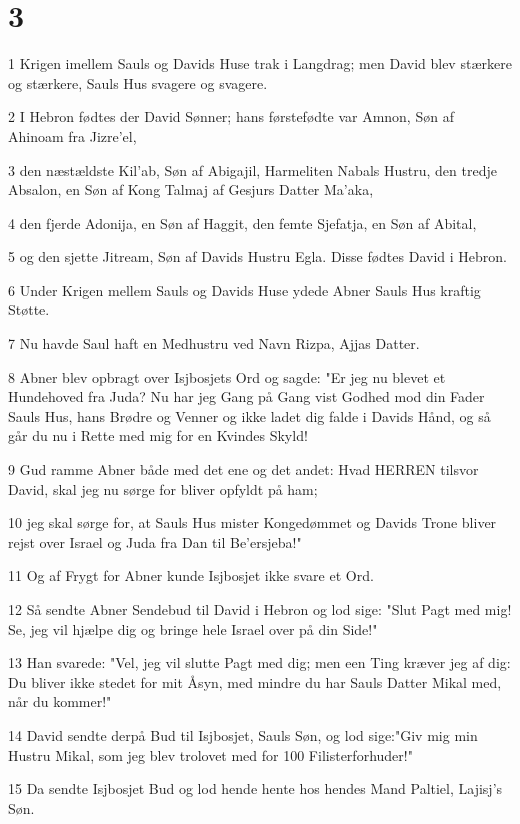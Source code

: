 \chapter{3}

\par 1 Krigen imellem Sauls og Davids Huse trak i Langdrag; men David blev stærkere og stærkere, Sauls Hus svagere og svagere.
\par 2 I Hebron fødtes der David Sønner; hans førstefødte var Amnon, Søn af Ahinoam fra Jizre'el,
\par 3 den næstældste Kil'ab, Søn af Abigajil, Harmeliten Nabals Hustru, den tredje Absalon, en Søn af Kong Talmaj af Gesjurs Datter Ma'aka,
\par 4 den fjerde Adonija, en Søn af Haggit, den femte Sjefatja, en Søn af Abital,
\par 5 og den sjette Jitream, Søn af Davids Hustru Egla. Disse fødtes David i Hebron.
\par 6 Under Krigen mellem Sauls og Davids Huse ydede Abner Sauls Hus kraftig Støtte.
\par 7 Nu havde Saul haft en Medhustru ved Navn Rizpa, Ajjas Datter.
\par 8 Abner blev opbragt over Isjbosjets Ord og sagde: "Er jeg nu blevet et Hundehoved fra Juda? Nu har jeg Gang på Gang vist Godhed mod din Fader Sauls Hus, hans Brødre og Venner og ikke ladet dig falde i Davids Hånd, og så går du nu i Rette med mig for en Kvindes Skyld!
\par 9 Gud ramme Abner både med det ene og det andet: Hvad HERREN tilsvor David, skal jeg nu sørge for bliver opfyldt på ham;
\par 10 jeg skal sørge for, at Sauls Hus mister Kongedømmet og Davids Trone bliver rejst over Israel og Juda fra Dan til Be'ersjeba!"
\par 11 Og af Frygt for Abner kunde Isjbosjet ikke svare et Ord.
\par 12 Så sendte Abner Sendebud til David i Hebron og lod sige: "Slut Pagt med mig! Se, jeg vil hjælpe dig og bringe hele Israel over på din Side!"
\par 13 Han svarede: "Vel, jeg vil slutte Pagt med dig; men een Ting kræver jeg af dig: Du bliver ikke stedet for mit Åsyn, med mindre du har Sauls Datter Mikal med, når du kommer!"
\par 14 David sendte derpå Bud til Isjbosjet, Sauls Søn, og lod sige:"Giv mig min Hustru Mikal, som jeg blev trolovet med for 100 Filisterforhuder!"
\par 15 Da sendte Isjbosjet Bud og lod hende hente hos hendes Mand Paltiel, Lajisj's Søn.
